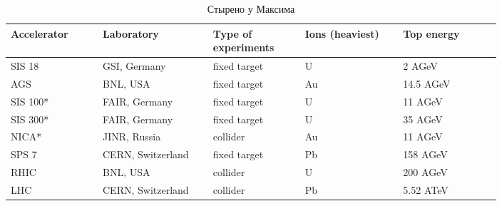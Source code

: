 
\todo

\begin{table}[H]
\caption{Стырено у Максима}
\label{tabl:Accelerators}
\begin{tabular}{ | p{0.15\linewidth} | p{0.18\linewidth} | p{0.15\linewidth} | p{0.16\linewidth} | p{0.16\linewidth} | }
\hline
Accelerator & Laboratory & Type of experiments & Ions (heaviest) & Top energy \\
\hline
SIS 18 & GSI, Germany & fixed target & U & 2 AGeV \\
\hline
AGS & BNL, USA & fixed target & Au & 14.5 AGeV \\
\hline
SIS 100* & FAIR, Germany & fixed target & U & 11 AGeV \\
\hline
SIS 300* & FAIR, Germany & fixed target & U & 35 AGeV \\
\hline
NICA* & JINR, Russia & collider & Au & 11 AGeV \\
\hline
SPS 7 & CERN, Switzerland & fixed target & Pb & 158 AGeV \\
\hline
RHIC & BNL, USA & collider & U & 200 AGeV \\
\hline
LHC & CERN, Switzerland & collider & Pb & 5.52 ATeV \\
\hline
\end{tabular}
\end{table}

\todo


